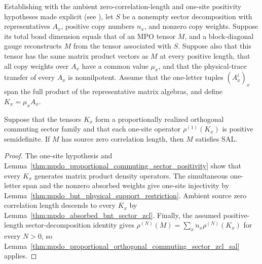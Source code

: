 \begin{theorem}
    \label{thm:mpdo_canonical_bnt_proportional_sectors_zcl_sal}
    \leanok
    Establishing \cite[Proposition~C.14]{Cirac2016MPDO_arXiv} with the
    ambient zero-correlation-length and one-site positivity hypotheses made
    explicit (see \cite{gap:cpsv16_commuting_form_to_sal}), let $S$ be a
    nonempty sector decomposition with representatives $A_x$, positive copy
    numbers $n_x$, and nonzero copy weights. Suppose its total bond dimension
    equals that of an MPO tensor $M$, and a block-diagonal gauge reconstructs
    $M$ from the tensor associated with $S$. Suppose also that this tensor has
    the same matrix product vectors as $M$ at every positive length, that all
    copy weights over $A_x$ have a common value $\mu_x$, and that the
    physical-trace transfer of every $A_x$ is nonnilpotent. Assume that the
    one-letter tuples $(A_x^i)_x$ span the full product of the representative
    matrix algebras, and define $K_x=\mu_xA_x$.

    Suppose that the tensors $K_x$ form a proportionally realized orthogonal
    commuting sector family and that each one-site operator
    $\rho^{(1)}(K_x)$ is positive semidefinite. If $M$ has source zero
    correlation length, then $M$ satisfies SAL.
\end{theorem}

\begin{proof}\leanok
    The one-site hypothesis and
    Lemma~\ref{thm:mpdo_proportional_commuting_sector_positivity} show that
    every $K_x$ generates matrix product density operators. The simultaneous
    one-letter span and the nonzero absorbed weights give one-site injectivity
    by Lemma~\ref{thm:mpdo_bnt_physical_support_restriction}. Ambient source
    zero correlation length descends to every $K_x$ by
    Lemma~\ref{thm:mpdo_absorbed_bnt_sector_zcl}. Finally, the assumed
    positive-length sector-decomposition identity gives
    $\rho^{(N)}(M)=\sum_x n_x\rho^{(N)}(K_x)$ for every $N>0$, so
    Lemma~\ref{thm:mpdo_proportional_orthogonal_commuting_sector_zcl_sal}
    applies.
\end{proof}

